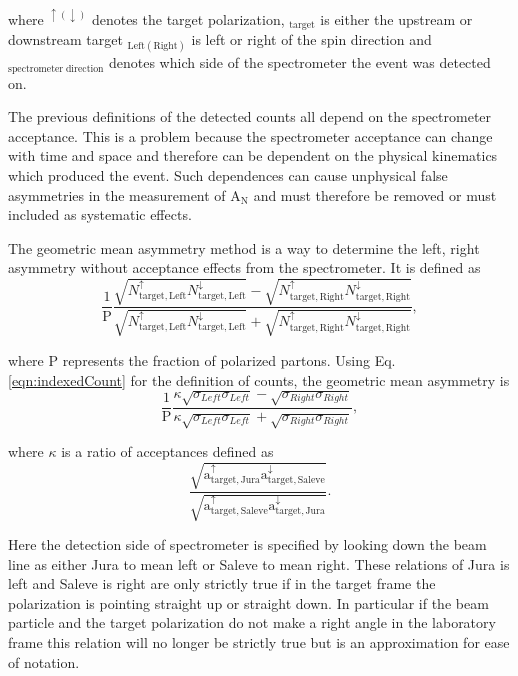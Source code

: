 \noindent
where $^{\uparrow(\downarrow)}$ denotes the target polarization,
$_{\mathrm{target}}$ is either the upstream or downstream target
$_{\mathrm{Left(Right)}}$ is left or right of the spin direction and
${_\mathrm{spectrometer \; direction}}$ denotes which side of the spectrometer
the event was detected on.

The previous definitions of the detected counts all depend on the spectrometer
acceptance.  This is a problem because the spectrometer acceptance can change
with time and space and therefore can be dependent on the physical kinematics
which produced the event.  Such dependences can cause unphysical false
asymmetries in the measurement of A$_{\mathrm{N}}$ and must therefore be removed
or must included as systematic effects.

The geometric mean asymmetry method is a way to determine the left, right
asymmetry without acceptance effects from the spectrometer.  It is defined as
\begin{equation}
  \label{eqn:ANgeomean}
\frac{1}{\mathrm{P}}\frac{\sqrt{N_{\mathrm{target,
        Left}}^{\uparrow}N_{\mathrm{target, Left}}^{\downarrow}} -
  \sqrt{N_{\mathrm{target, Right}}^{\uparrow}N_{\mathrm{target,
        Right}}^{\downarrow}} }{\sqrt{N_{\mathrm{target,
        Left}}^{\uparrow}N_{\mathrm{target, Left}}^{\downarrow}} +
  \sqrt{N_{\mathrm{target, Right}}^{\uparrow}N_{\mathrm{target,
        Right}}^{\downarrow}} },
\end{equation}

\noindent
where P represents the fraction of polarized partons. Using
Eq. \ref{eqn:indexedCount} for the definition of counts, the geometric mean
asymmetry is
\begin{equation}
\frac{1}{\mathrm{P}}\frac{\kappa \sqrt{\sigma_{Left}\sigma_{Left}} -
  \sqrt{\sigma_{Right}\sigma_{Right}}}{\kappa \sqrt{\sigma_{Left}\sigma_{Left}}
  + \sqrt{\sigma_{Right}\sigma_{Right}}},
\end{equation}

\noindent
where $\kappa$ is a ratio of acceptances defined as
\begin{equation}
  \label{eqn:ANgeomean_expand}
\frac{\sqrt{\mathrm{a}^{\uparrow}_{\mathrm{target,Jura}}
    \mathrm{a}^{\downarrow}_{\mathrm{target,Saleve}}}}
     {\sqrt{\mathrm{a}^{\uparrow}_{\mathrm{target,Saleve}}
         \mathrm{a}^{\downarrow}_{\mathrm{target,Jura}}}}.
\end{equation}

\noindent
Here the detection side of spectrometer is specified by looking down the beam
line as either Jura to mean left or Saleve to mean right.  These relations of
Jura is left and Saleve is right are only strictly true if in the target frame
the polarization is pointing straight up or straight down.  In particular if the
beam particle and the target polarization do not make a right angle in the
laboratory frame this relation will no longer be strictly true but is an
approximation for ease of notation.

